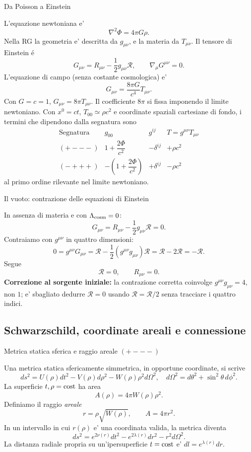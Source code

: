 \begin{frame}[t]{Da Poisson a Einstein}\small\raggedright

L'equazione newtoniana e'
\[
\nabla^2\Phi=4\pi G\rho.
\]
Nella RG la geometria e' descritta da $g_{\mu\nu}$, e la materia da $T_{\mu\nu}$. Il tensore di Einstein \'e
\[
G_{\mu\nu}=R_{\mu\nu}-\frac12g_{\mu\nu}\mathcal R,
\qquad\nabla_\mu G^{\mu\nu}=0.
\]
L'equazione di campo (senza costante cosmologica) e'
\[
G_{\mu\nu}=\frac{8\pi G}{c^4}T_{\mu\nu}.
\]
Con $G=c=1$, $G_{\mu\nu}=8\pi T_{\mu\nu}$.
Il coefficiente \(8\pi\) si fissa imponendo il limite newtoniano. Con \(x^0=ct\), \(T_{00}\simeq\rho c^2\) e coordinate spaziali cartesiane di fondo, i termini che dipendono dalla segnatura sono
\[
\begin{array}{c|ccc}
\text{Segnatura} & g_{00} & g^{ij} & T=g^{\mu\nu}T_{\mu\nu} \\ \hline
(+---) & 1+\dfrac{2\Phi}{c^2} & -\delta^{ij} & +\rho c^2 \\[4pt]
(-+++) & -\left(1+\dfrac{2\Phi}{c^2}\right) & +\delta^{ij} & -\rho c^2
\end{array}
\]
al primo ordine rilevante nel limite newtoniano.
\end{frame}

\begin{frame}[t]{Il vuoto: contrazione delle equazioni di Einstein}\small\raggedright

In assenza di materia e con $\Lambda_{\rm cosm}=0$:
\[
G_{\mu\nu}=R_{\mu\nu}-\frac12g_{\mu\nu}\mathcal R=0.
\]
Contraiamo con $g^{\mu\nu}$ in quattro dimensioni:
\[
0=g^{\mu\nu}G_{\mu\nu}
=\mathcal R-\frac12(g^{\mu\nu}g_{\mu\nu})\mathcal R
=\mathcal R-2\mathcal R=-\mathcal R.
\]
Segue
\[
\mathcal R=0,\qquad R_{\mu\nu}=0.
\]
\textbf{Correzione al sorgente iniziale:} la contrazione corretta coinvolge $g^{\mu\nu}g_{\mu\nu}=4$, non $1$; e' sbagliato dedurre $\mathcal R=0$ usando $\mathcal R=\mathcal R/2$ senza tracciare i quattro indici.

\end{frame}

\subsection{Schwarzschild, coordinate areali e connessione}

\begin{frame}[t]{Metrica statica sferica e raggio areale $(+---)$}\small\raggedright

Una metrica statica sfericamente simmetrica, in opportune coordinate, si scrive
\[
ds^2=U(\rho)dt^2-V(\rho)d\rho^2-W(\rho)\rho^2d\Omega^2,
\quad d\Omega^2=d\theta^2+\sin^2\theta\,d\phi^2.
\]
La superficie $t,\rho={\rm cost}$ ha area
\[
A(\rho)=4\pi W(\rho)\rho^2.
\]
Definiamo il raggio \emph{areale}
\[
r=\rho\sqrt{W(\rho)},\qquad A=4\pi r^2.
\]
In un intervallo in cui $r(\rho)$ e' una coordinata valida, la metrica diventa
\[
\boxed{ds^2=e^{2\nu(r)}dt^2-e^{2\lambda(r)}dr^2-r^2d\Omega^2.}
\]
La distanza radiale propria su un'ipersuperficie $t={\rm cost}$ e' $dl=e^{\lambda(r)}dr$.

\end{frame}

